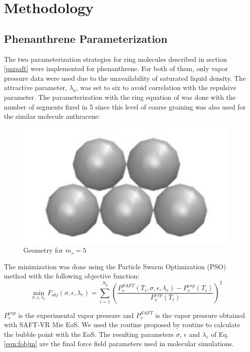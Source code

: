 \chapter{Methodology} %

\label{Chapter4} %

\section{Phenanthrene Parameterization}\label{parame}

The two parameterization strategies for ring molecules described in section \ref{parsaft} were implemented for phenanthrene. For both of them, only vapor pressure data \cite{pvphen} were used due to the unavailability of saturated liquid density. The attractive parameter, $\lambda _{a}$, was set to six to avoid correlation with the repulsive parameter. The parameterization with the ring equation of  was done with the number of segments fixed in 5 since this level of coarse graining was also used for the similar molecule anthracene:
\begin{figure}[th]
	\centering
	\includegraphics[width=0.25\linewidth]{Figures/fen5}
	\caption{Geometry for $m_{s}=5$}
	\label{fig:fen5}
\end{figure}

The minimization was done using the Particle Swarm Optimization (PSO) method with the following objective function:
\begin{equation}
\min\limits_{\sigma,\epsilon,\lambda_{r}} F_{obj}(\sigma,\epsilon,\lambda_{r})= \sum_{i=1}^{N_{p}} \left(\frac{P_{v}^{SAFT}(T_{i},\sigma,\epsilon,\lambda_{r})-P_{v}^{exp}(T_{i})}{P_{v}^{exp}(T_{i})} \right)^2
\label{eqn:fobjm}
\end{equation}

$P_{v}^{exp}$ is the experimental vapor pressure and $P_{v}^{SAFT}$ is the vapor pressure obtained with SAFT-VR Mie EoS. We used the routine proposed by   routine to calculate the bubble point with the EoS. The resulting  parameters $\sigma$, $\epsilon $ and $\lambda _{r}$ of Eq. \eqref{eqn:fobjm} are the final force field parameters used in molecular simulations. 


